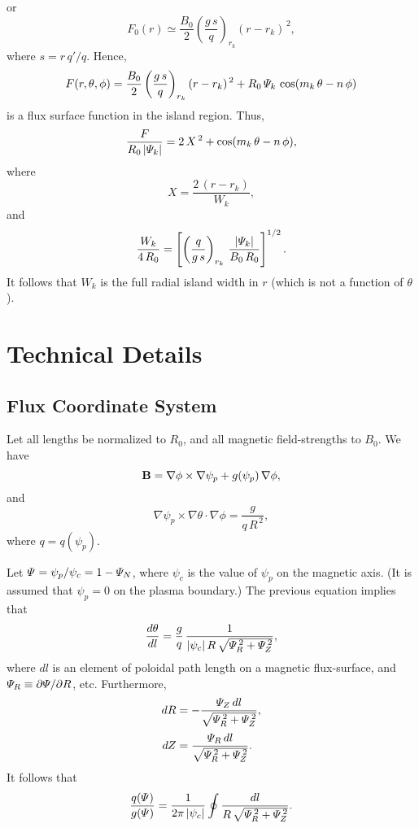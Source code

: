 \documentclass[12pt]{article}
\begin{document}
or
\begin{equation}
F_0(r) \simeq \frac{B_0}{2}\left(\frac{g\,s}{q}\right)_{r_k} (r-r_k)^{\,2},
\end{equation}
where $s=r\,q'/q$. 
Hence,
\begin{equation}
F(r,\theta,\phi) = \frac{B_0}{2}\left(\frac{g\,s}{q}\right)_{r_k}(r-r_k)^{\,2}
+R_0\,{\mit\Psi}_k\,\cos(m_k\,\theta-n\,\phi)
\end{equation}
is a flux surface function in the island region. 
Thus, 
\begin{equation}
\frac{F}{R_0\,|{\mit\Psi}_k|}= 2\,X^{\,2} + \cos(m_k\,\theta-n\,\phi),
\end{equation}
where
\begin{equation}
X = \frac{2\,(r-r_k)}{W_k},
\end{equation}
and
\begin{equation}
\frac{W_k}{4\,R_0} = \left[\left(\frac{q}{g\,s}\right)_{r_k}\,\frac{|{\mit\Psi}_k|}{B_0\,R_0}\right]^{1/2}.
\end{equation}
It follows that $W_k$ is the full radial island width  in $r$ (which is not a function of $\theta$).

\section{Technical Details}
\subsection{Flux Coordinate System}
Let all lengths be normalized to $R_0$, and all magnetic field-strengths to $B_0$. 
We have
\begin{equation}
{\bf B} =\nabla\phi\times \nabla\psi_p +g(\psi_p)\,\nabla\phi,
\end{equation}
and
\begin{equation}
\nabla\psi_p\times \nabla\theta\cdot\nabla\phi = \frac{g}{q\,R^{\,2}},
\end{equation}
where $q=q(\psi_p)$. 

Let ${\mit\Psi}=\psi_p/\psi_c = 1-{\mit\Psi}_N$, where $\psi_c$ is the value
of $\psi_p$ on the magnetic axis. (It is assumed that $\psi_p=0$ on the plasma boundary.) 
The previous equation implies that
\begin{equation}
\frac{d\theta}{dl} = \frac{g}{q}\,\frac{1}{|\psi_c|\,R\,\sqrt{{\mit\Psi}_R^{\,2}+{\mit\Psi}_Z^{\,2}}},
\end{equation}
where $dl$ is an element of poloidal path length on a magnetic flux-surface, and ${\mit\Psi}_R\equiv \partial{\mit\Psi}/\partial R$, etc. Furthermore,
\begin{align}
dR &= -\frac{{\mit\Psi}_Z\,dl}{\sqrt{{\mit\Psi}_R^{\,2}+{\mit\Psi}_Z^{\,2}}},\\[0.5ex]
dZ&= \frac{{\mit\Psi}_R\,dl}{\sqrt{{\mit\Psi}_R^{\,2}+{\mit\Psi}_Z^{\,2}}}.
\end{align}
It follows that
\begin{equation}
\frac{q({\mit\Psi})}{g({\mit\Psi})} = \frac{1}{2\pi\,|\psi_c|}\oint \frac{dl}{R\,\sqrt{{\mit\Psi}_R^{\,2}+{\mit\Psi}_Z^{\,2}}}.
\end{equation}
\end{document}
